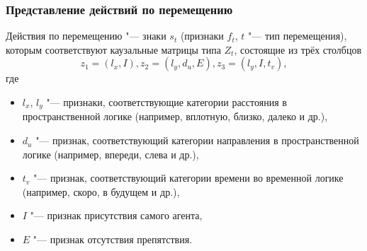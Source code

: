 	\begin{frame}
		\frametitle{Представление действий по перемещению}
		
		Действия по перемещению "--- знаки $s_t$ (признаки $f_t$, $t$ "--- тип перемещения), которым соответствуют каузальные матрицы типа $Z_t$, состоящие из трёх столбцов 
		\[
		z_1=(l_x, I), z_2=(l_y, d_u, E), z_3=(l_y, I, t_v),
		\]
		где 
		\begin{itemize}
			\item $l_x$, $l_y$ "--- признаки, соответствующие категории расстояния в пространственной логике  (например, вплотную, близко, далеко и др.), 
			\item $d_u$ "--- признак, соответствующий категории направления в пространственной логике (например, впереди, слева и др.), 
			\item $t_v$ "--- признак, соответствующий категории времени во временной логике (например, скоро, в будущем и др.),
			\item $I$ "--- признак присутствия самого агента, 
			\item $E$ "--- признак отсутствия препятствия.
		\end{itemize}
	\end{frame}	
	
